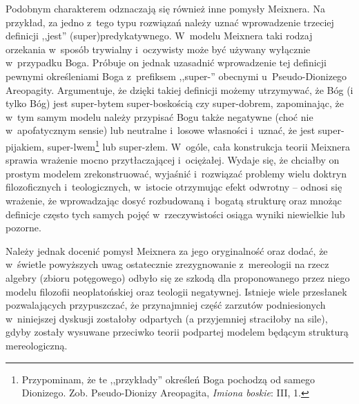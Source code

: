 Podobnym charakterem odznaczają się również inne pomysły Meixnera. Na przykład, za jedno z~tego typu rozwiązań należy uznać wprowadzenie trzeciej definicji ,,jest'' (super)predykatywnego. W~modelu Meixnera taki rodzaj orzekania w~sposób trywialny i~oczywisty może być używany wyłącznie w~przypadku Boga. Próbuje on jednak uzasadnić wprowadzenie tej definicji pewnymi określeniami Boga z~prefiksem ,,super-'' obecnymi u~Pseudo-Dionizego Areopagity. Argumentuje, że dzięki takiej definicji możemy utrzymywać, że Bóg (i tylko Bóg) jest super-bytem super-boskością czy super-dobrem, zapominając, że w~tym samym modelu należy przypisać Bogu także negatywne (choć nie w~apofatycznym sensie) lub neutralne i~losowe własności i~uznać, że jest super-pijakiem, super-lwem\footnote{Przypominam, że te ,,przykłady'' określeń Boga pochodzą od samego Dionizego. Zob. Pseudo-Dionizy Areopagita, \textit{Imiona boskie}: III, 1.} lub super-złem. W~ogóle, cała konstrukcja teorii Meixnera sprawia wrażenie mocno przytłaczającej i~ociężałej. Wydaje się, że chciałby on prostym modelem zrekonstruować, wyjaśnić i~rozwiązać problemy wielu doktryn filozoficznych i~teologicznych, w~istocie otrzymując efekt odwrotny -- odnosi się wrażenie, że wprowadzając dosyć rozbudowaną i~bogatą strukturę oraz mnożąc definicje często tych samych pojęć w~rzeczywistości osiąga wyniki niewielkie lub pozorne.

Należy jednak docenić pomysł Meixnera za jego oryginalność oraz dodać, że w~świetle powyższych uwag ostatecznie zrezygnowanie z~mereologii na rzecz algebry (zbioru potęgowego) odbyło się ze szkodą dla proponowanego przez niego modelu filozofii neoplatońskiej oraz teologii negatywnej. Istnieje wiele przesłanek pozwalających przypuszczać, że przynajmniej część zarzutów podniesionych w~niniejszej dyskusji zostałoby odpartych (a przyjemniej straciłoby na sile), gdyby zostały wysuwane przeciwko teorii podpartej modelem będącym strukturą mereologiczną.


